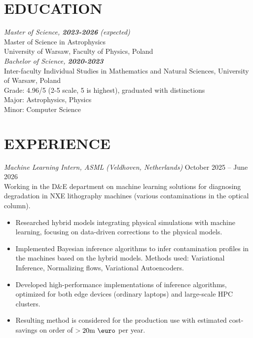 \documentclass[margin, 10pt]{res} %
\begin{document}
\begin{resume}

\section{EDUCATION}

{\sl Master of Science, \textbf{2023-2026} (expected)}\\
Master of Science in Astrophysics\\
University of Warsaw, Faculty of Physics, Poland\\

{\sl Bachelor of Science, \textbf{2020-2023}}\\
Inter-faculty Individual Studies in Mathematics and Natural Sciences, University of Warsaw, Poland\\
Grade:  4.96/5 (2-5 scale, 5 is highest), graduated with distinctions\\
Major: Astrophysics, Physics\\
Minor: Computer Science \par

\section{EXPERIENCE}


{\sl Machine Learning Intern, ASML (Veldhoven, Netherlands)} \hfill October 2025 -- June 2026\\
Working in the D\&E department on machine learning solutions for diagnosing degradation in NXE lithography machines (various contaminations in the optical column).
\begin{itemize}
    \item Researched hybrid models integrating physical simulations with machine learning, focusing on data-driven corrections to the physical models.
    \item Implemented Bayesian inference algorithms to infer contamination profiles in the machines based on the hybrid models. Methods used: Variational Inference,
    Normalizing flows, Variational Autoencoders.
    \item Developed high-performance implementations of inference algorithms, optimized for both edge devices (ordinary laptops) and large-scale HPC clusters.
    \item Resulting method is considered for the production use with estimated cost-savings on order of $>20 \textrm{m \euro}$ per year.
\end{itemize}


\end{resume}
\end{document}
